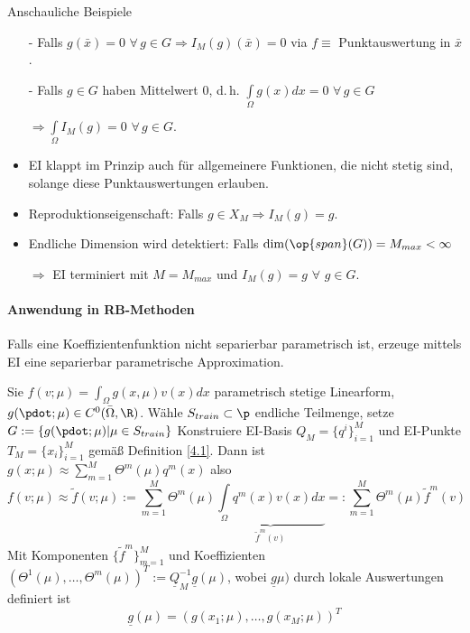 \begin{bem} Anschauliche Beispiele
	\begin{itemize}
		\item[-] Falls $g(\bar{x}) = 0 \,\, \forall \, g \in G \Rightarrow I_M(g) (\bar{x})=0$ via $f \equiv$ Punktauswertung in $\bar{x}$.
		\item[-] Falls $g \in G$ haben Mittelwert $0$, d.\,h. $\int\limits_{\Omega} g(x) dx = 0 \,\, \forall \, g \in G$
		
		$\Rightarrow \int\limits_{\Omega} I_M(g) = 0 \,\, \forall \, g \in G.$
		\item EI klappt im Prinzip auch für allgemeinere Funktionen, die nicht stetig sind, solange diese Punktauswertungen erlauben.
		\item Reproduktionseigenschaft: Falls $g \in X_M \Rightarrow I_M(g) = g$.
		\item Endliche Dimension wird detektiert: Falls $\dim(\op{span}(G)) = M_{max} < \infty$
		
		$\Rightarrow$ EI terminiert mit $M=M_{max}$ und $I_M(g) = g \,\, \forall \,\, g \in G$.
	\end{itemize}
\end{bem}


\paragraph*{Anwendung in RB-Methoden}
Falls eine Koeffizientenfunktion nicht separierbar parametrisch ist, erzeuge mittels EI eine separierbar parametrische Approximation.

\begin{defn}
Sie $f(v; \mu) = \int_{\Omega} g(x, \mu) v(x) dx$ parametrisch stetige Linearform, $g(\pdot; \mu) \in C^0 (\bar{\Omega},\R)$. Wähle $S_{train} \subset \p$ endliche Teilmenge, setze $G:= \{ g(\pdot;\mu) | \mu \in S_{train} \}$ Konstruiere EI-Basis $Q_M = \{q^i\}_{i=1}^M$ und EI-Punkte $T_M = \{x_i\}_{i=1}^M$ gemäß Definition \ref{4.1}. Dann ist $g(x;\mu) \approx \sum\limits_{m=1}^M \Theta^m(\mu)q^m(x)$ also
\[
	f(v;\mu) \approx \tilde{f}(v;\mu) := \sum\limits_{m=1}^M \Theta^m (\mu) \underbrace{\int\limits_{\Omega} q^m(x)v(x) dx}_{\tilde{f}^m(v)} =: \sum\limits_{m=1}^M \Theta^m(\mu) \tilde{f}^m(v)
\] 
Mit Komponenten $\{\tilde{f}^m\}_{m=1}^M$ und Koeffizienten $(\Theta^1(\mu), \dots, \Theta^m(\mu))^T := \underline{Q}_{M}^{-1} \underline{g}(\mu)$, wobei $\underline{g}\mu)$ durch lokale Auswertungen definiert ist
\[
	\underline{g}(\mu) = (g(x_1;\mu),\dots,g(x_M;\mu))^T
\]
\end{defn}

